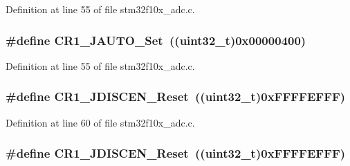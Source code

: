Definition at line 55 of file stm32f10x\+\_\+adc.\+c.

\subsubsection[{\texorpdfstring{C\+R1\+\_\+\+J\+A\+U\+T\+O\+\_\+\+Set}{CR1_JAUTO_Set}}]{\setlength{\rightskip}{0pt plus 5cm}\#define C\+R1\+\_\+\+J\+A\+U\+T\+O\+\_\+\+Set~(({\bf uint32\+\_\+t})0x00000400)}\hypertarget{group___a_d_c___private___defines_gaa8478f12e212738e249a7fafb69d4dd4}{}\label{group___a_d_c___private___defines_gaa8478f12e212738e249a7fafb69d4dd4}


Definition at line 55 of file stm32f10x\+\_\+adc.\+c.

\subsubsection[{\texorpdfstring{C\+R1\+\_\+\+J\+D\+I\+S\+C\+E\+N\+\_\+\+Reset}{CR1_JDISCEN_Reset}}]{\setlength{\rightskip}{0pt plus 5cm}\#define C\+R1\+\_\+\+J\+D\+I\+S\+C\+E\+N\+\_\+\+Reset~(({\bf uint32\+\_\+t})0x\+F\+F\+F\+F\+E\+F\+F\+F)}\hypertarget{group___a_d_c___private___defines_gab6ffba92495342bd5f0a8b1fa216526b}{}\label{group___a_d_c___private___defines_gab6ffba92495342bd5f0a8b1fa216526b}


Definition at line 60 of file stm32f10x\+\_\+adc.\+c.

\subsubsection[{\texorpdfstring{C\+R1\+\_\+\+J\+D\+I\+S\+C\+E\+N\+\_\+\+Reset}{CR1_JDISCEN_Reset}}]{\setlength{\rightskip}{0pt plus 5cm}\#define C\+R1\+\_\+\+J\+D\+I\+S\+C\+E\+N\+\_\+\+Reset~(({\bf uint32\+\_\+t})0x\+F\+F\+F\+F\+E\+F\+F\+F)}\hypertarget{group___a_d_c___private___defines_gab6ffba92495342bd5f0a8b1fa216526b}{}\label{group___a_d_c___private___defines_gab6ffba92495342bd5f0a8b1fa216526b}


